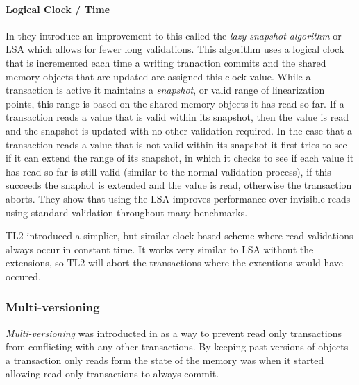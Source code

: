 \paragraph{Logical Clock / Time}
In \cite{10.1109/TPDS.2010.49} they introduce an improvement to this called the \emph{lazy snapshot algorithm} or LSA which allows for fewer long validations.
This algorithm uses a logical clock that is incremented each time a writing tranaction commits and the shared memory objects that are updated are assigned this clock value.
While a transaction is active it maintains a \emph{snapshot}, or valid range of linearization points, this range is based on the shared memory objects it has read so far.
If a transaction reads a value that is valid within its snapshot, then the value is read and the snapshot is updated with no other validation required.
In the case that a transaction reads a value that is not valid within its snapshot it first tries to see if it can extend the range of its snapshot, in which it checks to see if each value it has read so far is still valid (similar to the normal validation process), if this succeeds the snaphot is extended and the value is read, otherwise the transaction aborts.
They show that using the LSA improves performance over invisible reads using standard validation throughout many benchmarks.

TL2 \cite{Dice06transactionallocking} introduced a simplier, but similar clock based scheme where read validations always occur in constant time.
It works very similar to LSA without the extensions, so TL2 will abort the transactions where the extentions would have occured.

\subsubsection{Multi-versioning}
\emph{Multi-versioning} was introducted in \cite{1228566} as a way to prevent read only transactions from conflicting with any other transactions.
By keeping past versions of objects a transaction only reads form the state of the memory was when it started allowing read only transactions to always commit.

